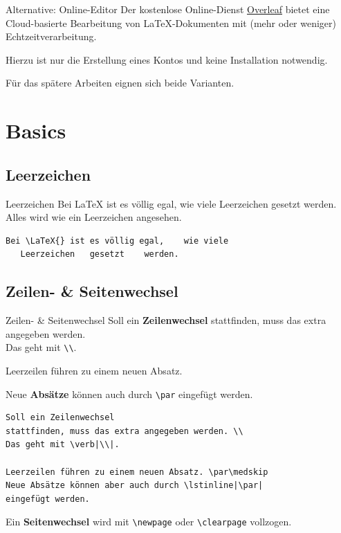 \documentclass[xcolor=dvipsnames]{beamer}
\begin{document}
\begin{frame}{Alternative: Online-Editor}
Der kostenlose Online-Dienst \href{https://de.overleaf.com/}{Overleaf} bietet eine Cloud-basierte Bearbeitung von \LaTeX{}-Dokumenten mit (mehr oder weniger) Echtzeitverarbeitung. \par\medskip
Hierzu ist nur die Erstellung eines Kontos und keine Installation notwendig. \par\medskip
Für das spätere Arbeiten eignen sich beide Varianten.
\end{frame}


\section{Basics}
\subsection{Leerzeichen}
\begin{frame}[fragile]{Leerzeichen}
Bei \LaTeX{} ist es völlig egal, wie viele Leerzeichen gesetzt werden. Alles wird wie ein Leerzeichen angesehen. \par\medskip
\begin{lstlisting}
Bei \LaTeX{} ist es völlig egal,    wie viele
   Leerzeichen   gesetzt    werden.
\end{lstlisting}
\end{frame}


\subsection{Zeilen- \& Seitenwechsel}
\begin{frame}[fragile]{Zeilen- \& Seitenwechsel}
Soll ein \textbf{Zeilenwechsel} stattfinden, muss das extra angegeben werden. \\
Das geht mit \verb|\\|. \par\medskip
Leerzeilen führen zu einem neuen Absatz. \par\medskip
Neue \textbf{Absätze} können auch durch \lstinline|\par| eingefügt werden. \par\medskip
\begin{lstlisting}
Soll ein Zeilenwechsel
stattfinden, muss das extra angegeben werden. \\
Das geht mit \verb|\\|.

Leerzeilen führen zu einem neuen Absatz. \par\medskip
Neue Absätze können aber auch durch \lstinline|\par| 
eingefügt werden.
\end{lstlisting}
Ein \textbf{Seitenwechsel} wird mit \lstinline|\newpage| oder \lstinline|\clearpage| vollzogen.
\end{frame}
\end{document}
